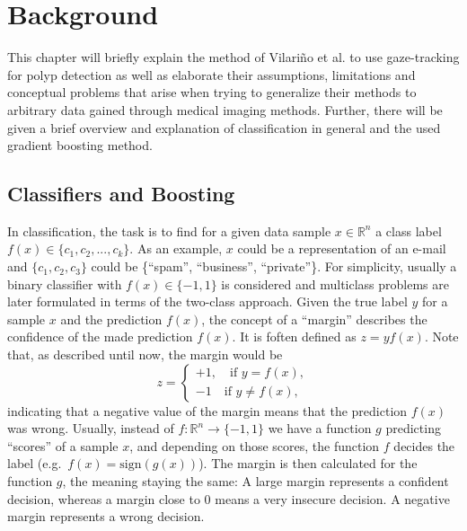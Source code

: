 \chapter{Background}
\label{chap:background}
This chapter will briefly explain the method of Vilari\~no et al. to use gaze-tracking for polyp detection as well as elaborate their assumptions, limitations and conceptual problems that arise when trying to generalize their methods to arbitrary data gained through medical imaging methods. Further, there will be given a brief overview and explanation of classification in general and the used gradient boosting method.

\section{Classifiers and Boosting}
In classification, the task is to find for a given data sample $x \in \mathbb{R}^n$ a class label $f(x) \in \{c_1, c_2, ..., c_k\}$. As an example, $x$ could be a representation of an e-mail and $\{c_1,c_2,c_3\}$ could be \{``spam'', ``business'', ``private''\}. For simplicity, usually a binary classifier with $f(x) \in \{-1,1\}$ is considered and multiclass problems are later formulated in terms of the two-class approach. 
Given the true label $y$ for a sample $x$ and the prediction $f(x)$, the concept of a ``margin'' describes the confidence of the made prediction $f(x).$ 
It is foften defined as $z = y f(x)$.
Note that, as described until now, the margin would be
\begin{equation*}
z = 
     \begin{cases}
	+1, \quad \text{if } y = f(x), \\
	-1 \quad \text{if } y \neq f(x),
      \end{cases}
\end{equation*}
indicating that a negative value of the margin means that the prediction $f(x)$ was wrong. Usually, instead of $f: \mathbb{R}^n \longrightarrow \{-1,1\}$ we have a function $g$ predicting ``scores'' of a sample $x$, and depending on those scores, the function $f$ decides the label (e.g.\ $f(x) = \text{sign}(g(x))$). The margin is then calculated for the function $g$, the meaning staying the same: A large margin represents a confident decision, whereas a margin close to $0$ means a very insecure decision. A negative margin represents a wrong decision.

